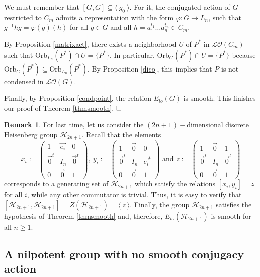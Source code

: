 \documentclass[12pt]{article}
\theoremstyle{definition}
\newtheorem{rem}{Remark}
\begin{document}
        We must remember that $[G,G]\subseteq \langle\ g_0\ \rangle$. For it, the conjugated action of $G$ restricted to $C_m$ admits a representation with the form $\varphi:G\rightarrow L_n$, such that $g^{-1}hg=\varphi(g)(h)$ for all $g\in G$ and all $h=a_1^{t_1}\dots a_n^{t_n}\in C_m$.

        By Proposition \ref{matrixact}, there exists a neighborhood $U$ of $P^*$ in $\mathcal{LO}(C_m)$ such that Orb$_{L_n}(P^*)\cap U=\{P^*\}$. In particular, Orb$_G(P^*)\cap U=\{P^*\}$ because Orb$_G(P^*)\subseteq \text{Orb}_{L_n}(P^*)$. By Proposition \ref{dico}, this implies that $P$ is not condensed in $\mathcal{LO}(G)$.  

        Finally, by Proposition \ref{condpoint}, the relation $E_{lo}(G)$ is smooth. This finishes our proof of Theorem \ref{thmsmooth}. $\hfill\square$

\begin{rem}
For last time, let us consider the $(2n+1)-$dimensional discrete Heisenberg group $\mathcal{H}_{2n+1}$. Recall that the elements
$$x_i:=\left ( 
\begin{array}{ccc}
1 & \vec{e_i} & 0\\
\vec{0}^t & I_n & \vec{0}^t\\
0 & \vec{0} & 1
\end{array}
\right ), \
y_i:=\left ( 
\begin{array}{ccc}
1 & \vec{0} & 0\\
\vec{0}^t & I_n & \vec{e_i}^t\\
0 & \vec{0} & 1
\end{array}
\right ) \text{ and }
z:=
\left ( 
\begin{array}{ccc}
1 & \vec{0} & 1\\
\vec{0}^t & I_n & \vec{0}^t\\
0 & \vec{0} & 1
\end{array}
\right )
$$
corresponds to a generating set of $\mathcal{H}_{2n+1}$ which satisfy the relations $[x_i,y_i]=z$ for all $i$, while any other commutator is trivial. Thus, it is easy to verify that $[\mathcal{H}_{2n+1},\mathcal{H}_{2n+1}]=Z(\mathcal{H}_{2n+1})=\langle\ z\ \rangle.$ Finally, the group $\mathcal{H}_{2n+1}$ satisfies the hypothesis of Theorem \ref{thmsmooth} and, therefore, $E_{lo}(\mathcal{H}_{2n+1})$ is smooth for all $n\geq 1.$
\end{rem}

\subsection{A nilpotent group with no smooth conjugacy action}
\end{document}
